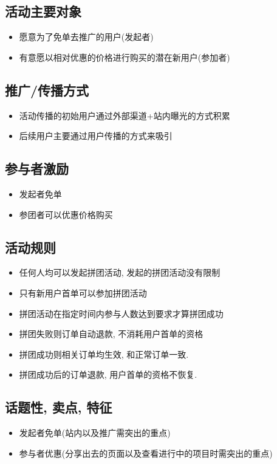 \documentclass[11pt,a4paper]{article}
\begin{document}
\subsection{活动主要对象}
\label{sec:orge48eab0}
\begin{itemize}
\item 愿意为了免单去推广的用户(发起者)
\item 有意愿以相对优惠的价格进行购买的潜在新用户(参加者)
\end{itemize}
\subsection{推广/传播方式}
\label{sec:orge1deb83}
\begin{itemize}
\item 活动传播的初始用户通过外部渠道+站内曝光的方式积累
\item 后续用户主要通过用户传播的方式来吸引
\end{itemize}
\subsection{参与者激励}
\label{sec:orgdad431a}
\begin{itemize}
\item 发起者免单
\item 参团者可以优惠价格购买
\end{itemize}
\subsection{活动规则}
\label{sec:org92e9da5}
\begin{itemize}
\item 任何人均可以发起拼团活动, 发起的拼团活动没有限制
\item 只有新用户首单可以参加拼团活动
\item 拼团活动在指定时间内参与人数达到要求才算拼团成功
\item 拼团失败则订单自动退款, 不消耗用户首单的资格
\item 拼团成功则相关订单均生效, 和正常订单一致.
\item 拼团成功后的订单退款, 用户首单的资格不恢复.
\end{itemize}
\subsection{话题性, 卖点, 特征}
\label{sec:org888c715}
\begin{itemize}
\item 发起者免单(站内以及推广需突出的重点)
\item 参与者优惠(分享出去的页面以及查看进行中的项目时需突出的重点)
\end{itemize}
\end{document}

